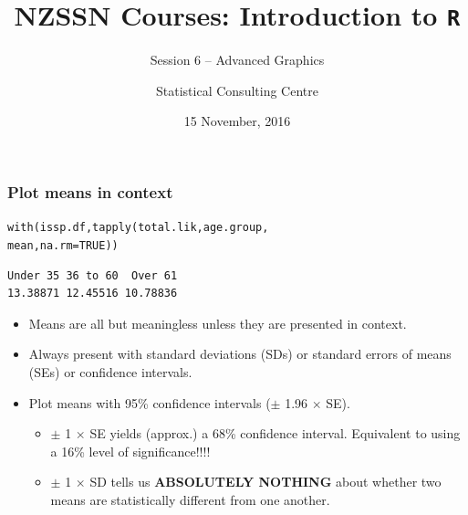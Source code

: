 \documentclass{beamer}\usepackage[]{graphicx}\usepackage[]{color}
\author[SCC]{Statistical Consulting Centre}%
\institute[\href{mailto:consulting@stat.auckland.ac.nz}
  {consulting@stat.auckland.ac.nz}]{\href{mailto:consulting@stat.auckland.ac.nz}
  {consulting@stat.auckland.ac.nz}\\
The Department of Statistics\\
The University of Auckland}
\title[Session 6 -- Advanced Graphics]{NZSSN Courses: Introduction
to \texttt{R}}
\subtitle{Session 6 -- Advanced Graphics}
\date{15 November, 2016}
\makeatletter
\newcommand{\hlnum}[1]{\textcolor[rgb]{0.533,0,0.133}{#1}}%
\newcommand{\hlstd}[1]{\textcolor[rgb]{0,0,0}{#1}}%
\newcommand{\hlkwc}[1]{\textcolor[rgb]{0,0,0.4}{#1}}%
\newcommand{\hlkwd}[1]{\textcolor[rgb]{0,0.267,0.4}{#1}}%
\newenvironment{kframe}{%
 \def\at@end@of@kframe{}%
 \ifinner\ifhmode%
  \def\at@end@of@kframe{\end{minipage}}%
  \begin{minipage}{\columnwidth}%
 \fi\fi%
 \def\FrameCommand##1{\hskip\@totalleftmargin \hskip-\fboxsep
 \colorbox{shadecolor}{##1}\hskip-\fboxsep
     \hskip-\linewidth \hskip-\@totalleftmargin \hskip\columnwidth}%
 \MakeFramed {\advance\hsize-\width
   \@totalleftmargin\z@ \linewidth\hsize
   \@setminipage}}%
 {\par\unskip\endMakeFramed%
 \at@end@of@kframe}
\newenvironment{knitrout}{}{} %
\makeatother
\begin{document}
\maketitle
 
\begin{frame}[fragile]
  \frametitle{Plot means in context}

\begin{knitrout}
\color{fgcolor}\begin{kframe}
\begin{alltt}
\hlkwd{with}\hlstd{(issp.df,} \hlkwd{tapply}\hlstd{(total.lik, age.group,}
                     \hlstd{mean,} \hlkwc{na.rm} \hlstd{=} \hlnum{TRUE}\hlstd{))}
\end{alltt}
\begin{verbatim}
Under 35 36 to 60  Over 61 
13.38871 12.45516 10.78836 
\end{verbatim}
\end{kframe}
\end{knitrout}
\begin{itemize}
\item Means are all but meaningless unless they are presented in context.
\item Always present with standard deviations (SDs) or standard errors of means (SEs) or confidence intervals.
\item Plot means with 95\% confidence intervals ($\pm$ 1.96 $\times$ SE).
\begin{itemize}
\item $\pm$ 1 $\times$ SE yields (approx.) a 68\% confidence interval. Equivalent to using a 16\% level of significance!!!!
\item $\pm$ 1 $\times$ SD tells us \textbf{ABSOLUTELY NOTHING} about whether two means are statistically different from one another.
\end{itemize}
\end{itemize}
\end{frame} 
\end{document}
